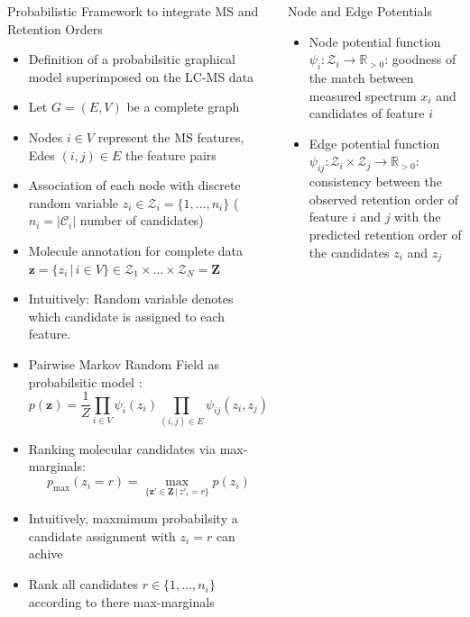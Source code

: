 \documentclass{beamer}
\newcommand{\ms}{MS}
\newcommand{\lc}{LC}
\newcommand{\lcms}{\lc-\ms}
\newcommand{\cands}{\mathcal{C}}
\newcommand{\seqlength}{N}
\begin{document}
\begin{frame}{}
\begin{columns}[T]
    \begin{block}{{\normalsize Probabilistic Framework to integrate \ms{} and Retention Orders}}
    \begin{itemize}
        \item Definition of a probabilsitic graphical model superimposed on the \lcms{} data
        \item Let $G=(E,V)$ be a complete graph
        \item Nodes $i\in V$ represent the \ms{} features, Edes $(i,j)\in E$ the feature pairs
        \item Association of each node with discrete random variable $z_i\in\mathcal{Z}_i=\{1,\ldots,n_i\}$ ($n_i=|\cands_i|$ number of candidates)
        \item Molecule annotation for complete data $\mathbf{z}=\{z_i\,|\,i\in V\}\in\mathcal{Z}_1\times\ldots\times\mathcal{Z}_\seqlength=\mathbf{Z}$
        \item Intuitively: Random variable denotes which candidate is assigned to each feature.
        \item Pairwise Markov Random Field as probabilsitic model \cite{MacKay2005}:
            \begin{equation}
                p(\mathbf{z})=\frac{1}{Z}\prod_{i\in V}\psi_i(z_i)\prod_{(i,j)\in E}\psi_{ij}(z_i,z_j)
            \end{equation}
        \item Ranking molecular candidates via max-marginals:
            \begin{equation}
                p_{\max}(z_i=r)=\underset{\{\mathbf{z}'\in\mathbf{Z}\,|\,z'_i=r\}}{\max}p(z_i)
            \end{equation}
        \item Intuitively, maxmimum probabilsity a candidate assignment with $z_i=r$ can achive
        \item Rank all candidates $r\in\{1,\ldots,n_i\}$ according to there max-marginals
    \end{itemize}
    \end{block}

    \begin{block}{Node and Edge Potentials}
    \begin{itemize}
        \item Node potential function $\psi_i:\mathcal{Z}_i\rightarrow\mathbb{R}_{>0}$: goodness of the match between measured spectrum $x_i$ and candidates of feature $i$
        \item Edge potential function $\psi_{ij}:\mathcal{Z}_i\times\mathcal{Z}_j\rightarrow\mathbb{R}_{>0}$: consistency between the observed retention order of feature $i$ and $j$ with the predicted retention order of the candidates $z_i$ and $z_j$
    \end{itemize}
    \end{block}




\end{columns}
\end{frame}
\end{document}
